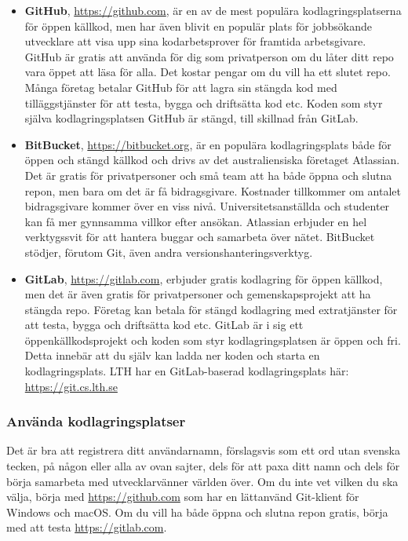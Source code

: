 \begin{itemize}
\item  \textbf{GitHub}, \url{https://github.com}, är en av de mest populära kodlagringsplatserna för öppen källkod, men har även blivit en populär plats för jobbsökande utvecklare att visa upp sina  kodarbetsprover för framtida arbetsgivare. GitHub är gratis att använda för dig som privatperson om du låter ditt repo vara öppet att läsa för alla. Det kostar pengar om du vill ha ett slutet repo. Många företag betalar GitHub för att lagra sin stängda kod med tilläggstjänster för att testa, bygga och driftsätta kod etc. Koden som styr själva kodlagringsplatsen GitHub är stängd, till skillnad från GitLab.

\item \textbf{BitBucket}, \url{https://bitbucket.org}, är en populära kodlagringsplats både för öppen och stängd källkod och drivs av det australiensiska företaget Atlassian. Det är gratis för privatpersoner och små team att ha både öppna och slutna repon, men bara om det är få bidragsgivare. Kostnader tillkommer om antalet bidragsgivare kommer över en viss nivå. Universitetsanställda och studenter kan få mer gynnsamma villkor efter ansökan. Atlassian erbjuder en hel verktygssvit för att hantera buggar och samarbeta över nätet. BitBucket stödjer, förutom Git, även andra versionshanteringsverktyg.

\item \textbf{GitLab}, \url{https://gitlab.com}, erbjuder gratis kodlagring för öppen källkod, men det är även gratis för privatpersoner och gemenskapsprojekt att ha stängda repo. Företag kan betala för stängd kodlagring med extratjänster för att testa, bygga och driftsätta kod etc. GitLab är i sig ett öppenkällkodsprojekt och koden som styr kodlagringsplatsen är öppen och fri. Detta innebär att du själv kan ladda ner koden och starta en kodlagringsplats. LTH har en GitLab-baserad kodlagringsplats här: \url{https://git.cs.lth.se}

\end{itemize}

\subsubsection{Använda kodlagringsplatser}

Det är bra att registrera ditt användarnamn, förslagsvis  som ett ord utan svenska tecken, på någon eller alla av ovan sajter, dels för att paxa ditt namn och dels för börja samarbeta med utvecklarvänner världen över. Om du inte vet vilken du ska välja, börja med \url{https://github.com} som har en lättanvänd Git-klient för Windows och macOS. Om du vill ha både öppna och slutna repon gratis, börja med att testa \url{https://gitlab.com}. 


